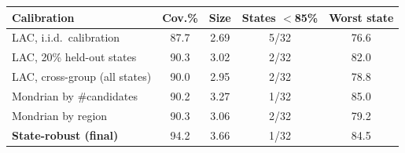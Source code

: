 \begin{tabular}{lcccc}
\toprule
Calibration & Cov.\% & Size & States $<$85\% & Worst state \\
\midrule
LAC, i.i.d.\ calibration & 87.7 & 2.69 & 5/32 & 76.6 \\
LAC, 20\% held-out states & 90.3 & 3.02 & 2/32 & 82.0 \\
LAC, cross-group (all states) & 90.0 & 2.95 & 2/32 & 78.8 \\
Mondrian by \#candidates & 90.2 & 3.27 & 1/32 & 85.0 \\
Mondrian by region & 90.3 & 3.06 & 2/32 & 79.2 \\
\textbf{State-robust (final)} & 94.2 & 3.66 & 1/32 & 84.5 \\
\bottomrule
\end{tabular}
